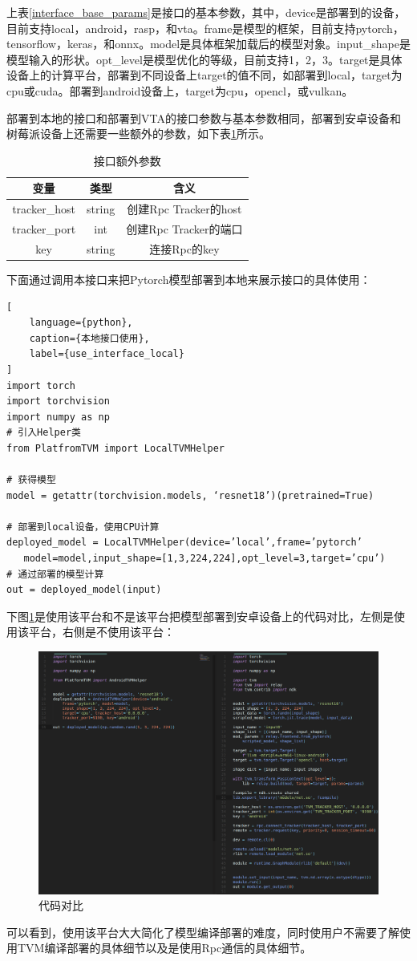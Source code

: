 上表\ref{interface_base_params}是接口的基本参数，其中，device是部署到的设备，目前支持local，android，rasp，和vta。frame是模型的框架，目前支持pytorch，tensorflow，keras，和onnx。model是具体框架加载后的模型对象。input\_shape是模型输入的形状。opt\_level是模型优化的等级，目前支持1，2，3。target是具体设备上的计算平台，部署到不同设备上target的值不同，如部署到local，target为cpu或cuda。部署到android设备上，target为cpu，opencl，或vulkan。

部署到本地的接口和部署到VTA的接口参数与基本参数相同，部署到安卓设备和树莓派设备上还需要一些额外的参数，如下表\ref{interface_extra_params}所示。

\begin{table}
    \centering
    \caption{接口额外参数}
    \label{interface_extra_params}
    \begin{tabular}{c|c|c}
        \hline
        变量            & 类型     & 含义                 \\ \hline
        tracker\_host & string & 创建Rpc Tracker的host \\ \hline
        tracker\_port & int    & 创建Rpc Tracker的端口   \\ \hline
        key           & string & 连接Rpc的key          \\ \hline
    \end{tabular}
\end{table}

下面通过调用本接口来把Pytorch模型部署到本地来展示接口的具体使用：

\begin{lstlisting}[
    language={python},
    caption={本地接口使用},
    label={use_interface_local}
]
import torch
import torchvision
import numpy as np
# 引入Helper类
from PlatfromTVM import LocalTVMHelper

# 获得模型
model = getattr(torchvision.models, ‘resnet18’)(pretrained=True)

# 部署到local设备，使用CPU计算
deployed_model = LocalTVMHelper(device=’local’,frame=’pytorch’
   model=model,input_shape=[1,3,224,224],opt_level=3,target=’cpu’)
# 通过部署的模型计算
out = deployed_model(input)
\end{lstlisting}

下图\ref{compare}是使用该平台和不是该平台把模型部署到安卓设备上的代码对比，左侧是使用该平台，右侧是不使用该平台：

\begin{figure}[h!]
    \centering
    \includegraphics[]{figure/compare.png}
    \caption{代码对比}
    \label{compare}
\end{figure}

可以看到，使用该平台大大简化了模型编译部署的难度，同时使用户不需要了解使用TVM编译部署的具体细节以及是使用Rpc通信的具体细节。